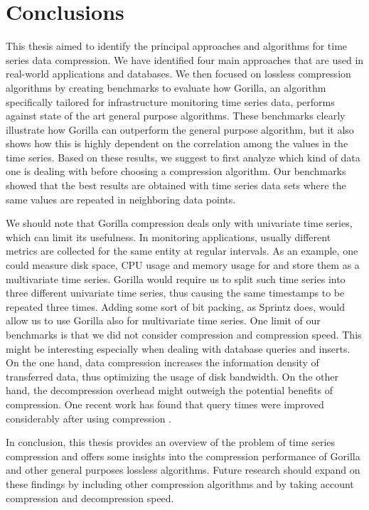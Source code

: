 \chapter*{Conclusions}
This thesis aimed to identify the principal approaches and algorithms for time series data compression.
We have identified four main approaches that are used in real-world applications and databases.
We then focused on lossless compression algorithms by creating benchmarks to evaluate how Gorilla,
an algorithm specifically tailored for infrastructure monitoring time series data, performs against
state of the art general purpose algorithms. 
These benchmarks clearly illustrate how Gorilla can outperform the general purpose algorithm, but it
also shows how this is highly dependent on the correlation among the values in the time series.
Based on these results, we suggest to first analyze which kind of data one is dealing with before choosing
a compression algorithm. Our benchmarks showed that the best results are obtained with time series data sets where
the same values are repeated in neighboring data points.

We should note that Gorilla compression deals only with univariate time series, which can limit
its usefulness. In monitoring applications, usually different metrics are collected for the
same entity at regular intervals. As an example, one could measure disk space, CPU usage and memory usage
for and store them as a multivariate time series. Gorilla would require us to split such time series into
three different univariate time series, thus causing the same timestamps to be repeated three times.
Adding some sort of bit packing, as Sprintz does, would allow us to use Gorilla also for multivariate time series.
One limit of our benchmarks is that we did not consider compression and compression speed.
This might be interesting especially when dealing with database queries and inserts. On the one hand,
data compression increases the information density of transferred data, thus
optimizing the usage of disk bandwidth. On the other hand, the decompression overhead might outweigh the potential
benefits of compression. One recent work has found that query times were improved
considerably after using compression \cite{burman2017implementing}.

In conclusion, this thesis provides an overview of the problem of time series compression and offers some insights
into the compression performance of Gorilla and other general purposes lossless algorithms. Future research should expand
on these findings by including other compression algorithms and by taking account compression and
decompression speed.

